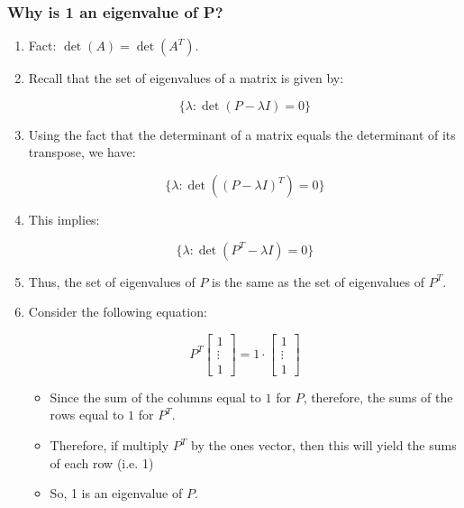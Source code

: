 \subsubsection{Why is 1 an eigenvalue of P?}
\begin{derivation}
    \begin{enumerate}
        \item Fact: $\det(A) = \det(A^T)$.
    
        \item Recall that the set of eigenvalues of a matrix is given by:
        
        \[
        \{ \lambda : \det(P - \lambda I) = 0 \}
        \]
        
        \item Using the fact that the determinant of a matrix equals the determinant of its transpose, we have:
        
        \[
        \{ \lambda : \det((P - \lambda I)^T) = 0 \}
        \]
        
        \item This implies:
        
        \[
        \{ \lambda : \det(P^T - \lambda I) = 0 \}
        \]
        
        \item Thus, the set of eigenvalues of $P$ is the same as the set of eigenvalues of $P^T$.
        
        \item Consider the following equation:
        
        \[
        P^T \begin{bmatrix} 1 \\ \vdots \\ 1 \end{bmatrix} = 1 \cdot \begin{bmatrix} 1 \\ \vdots \\ 1 \end{bmatrix}
        \]
        \begin{itemize}
            \item Since the sum of the columns equal to $1$ for $P$, therefore, the sums of the rows equal to $1$ for $P^T$. 
            \item Therefore, if multiply $P^T$ by the ones vector, then this will yield the sums of each row (i.e. 1)
            \item So, 1 is an eigenvalue of $P$.
        \end{itemize}
    \end{enumerate}

\end{derivation}

